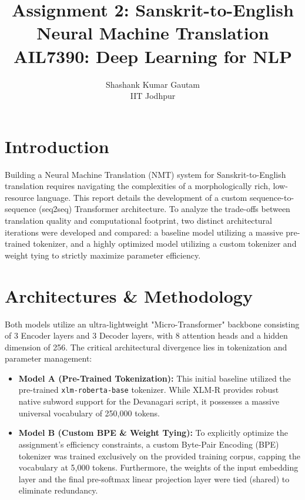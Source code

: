 \documentclass[11pt]{article}
\title{\textbf{Assignment 2: Sanskrit-to-English Neural Machine Translation}\\
\large AIL7390: Deep Learning for NLP}
\author{Shashank Kumar Gautam \\ IIT Jodhpur}
\date{}
\begin{document}
\maketitle

\section{Introduction}
Building a Neural Machine Translation (NMT) system for Sanskrit-to-English translation requires navigating the complexities of a morphologically rich, low-resource language. This report details the development of a custom sequence-to-sequence (seq2seq) Transformer architecture. To analyze the trade-offs between translation quality and computational footprint, two distinct architectural iterations were developed and compared: a baseline model utilizing a massive pre-trained tokenizer, and a highly optimized model utilizing a custom tokenizer and weight tying to strictly maximize parameter efficiency.

\section{Architectures \& Methodology}
Both models utilize an ultra-lightweight "Micro-Transformer" backbone consisting of 3 Encoder layers and 3 Decoder layers, with 8 attention heads and a hidden dimension of 256. The critical architectural divergence lies in tokenization and parameter management:

\begin{itemize}[leftmargin=*]
    \item \textbf{Model A (Pre-Trained Tokenization):} This initial baseline utilized the pre-trained \texttt{xlm-roberta-base} tokenizer. While XLM-R provides robust native subword support for the Devanagari script, it possesses a massive universal vocabulary of 250,000 tokens.
    \item \textbf{Model B (Custom BPE \& Weight Tying):} To explicitly optimize the assignment's efficiency constraints, a custom Byte-Pair Encoding (BPE) tokenizer was trained exclusively on the provided training corpus, capping the vocabulary at 5,000 tokens. Furthermore, the weights of the input embedding layer and the final pre-softmax linear projection layer were tied (shared) to eliminate redundancy.
\end{itemize}
\end{document}
